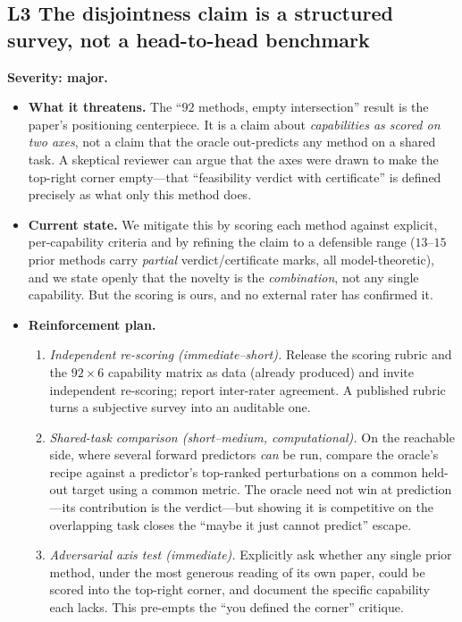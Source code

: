 \documentclass[11pt]{article}
\newcommand{\sev}[2]{\textcolor{#1}{\textbf{#2}}}
\begin{document}
\subsection{L3 \quad The disjointness claim is a structured survey, not a head-to-head benchmark}
\sev{sev2}{Severity: major.}
\begin{itemize}
\item[] \textbf{What it threatens.} The ``$92$ methods, empty intersection'' result is the
paper's positioning centerpiece. It is a claim about \emph{capabilities as scored on two axes},
not a claim that the oracle out-predicts any method on a shared task. A skeptical reviewer can
argue that the axes were drawn to make the top-right corner empty---that ``feasibility verdict
with certificate'' is defined precisely as what only this method does.
\item[] \textbf{Current state.} We mitigate this by scoring each method against explicit,
per-capability criteria and by refining the claim to a defensible range ($13$--$15$ prior
methods carry \emph{partial} verdict/certificate marks, all model-theoretic), and we state
openly that the novelty is the \emph{combination}, not any single capability. But the scoring is
ours, and no external rater has confirmed it.
\item[] \textbf{Reinforcement plan.}
\begin{enumerate}
\item \emph{Independent re-scoring (immediate--short).} Release the scoring rubric and the
$92\times6$ capability matrix as data (already produced) and invite independent re-scoring;
report inter-rater agreement. A published rubric turns a subjective survey into an auditable one.
\item \emph{Shared-task comparison (short--medium, computational).} On the reachable side, where
several forward predictors \emph{can} be run, compare the oracle's recipe against a predictor's
top-ranked perturbations on a common held-out target using a common metric. The oracle need not
win at prediction---its contribution is the verdict---but showing it is competitive on the
overlapping task closes the ``maybe it just cannot predict'' escape.
\item \emph{Adversarial axis test (immediate).} Explicitly ask whether any single prior method,
under the most generous reading of its own paper, could be scored into the top-right corner, and
document the specific capability each lacks. This pre-empts the ``you defined the corner'' critique.
\end{enumerate}
\end{itemize}
\end{document}
